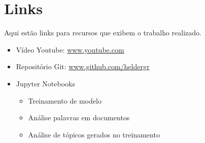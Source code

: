 \section{Links}

Aqui estão links para recursos que exibem o trabalho realizado.

\begin{itemize}
    \item Vídeo Youtube: \url{www.youtube.com}
    \item Repositório Git: \url{www.github.com/heldergr}
    \item Jupyter Notebooks
        \begin{itemize}
            \item Treinamento de modelo
            \item Análise palavras em documentos
            \item Análise de tópicos gerados no treinamento
        \end{itemize}
\end{itemize}